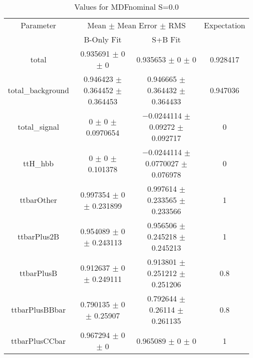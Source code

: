 \begin{table}
\centering
\caption{Values for MDFnominal S=0.0}
\begin{tabular}{cccc}
\toprule
Parameter & \multicolumn{2}{c}{Mean $\pm$ Mean Error $\pm$ RMS} & Expectation\\
 & B-Only Fit & S+B Fit & \\
\midrule
total & \num{0.935691} $\pm$ \num{0} $\pm$ \num{0} & \num{0.935653} $\pm$ \num{0} $\pm$ \num{0} & \num{0.928417}\\
total\_background & \num{0.946423} $\pm$ \num{0.364452} $\pm$ \num{0.364453} & \num{0.946665} $\pm$ \num{0.364432} $\pm$ \num{0.364433} & \num{0.947036}\\
total\_signal & \num{0} $\pm$ \num{0} $\pm$ \num{0.0970654} & \num{-0.0244114} $\pm$ \num{0.09272} $\pm$ \num{0.092717} & \num{0}\\
ttH\_hbb & \num{0} $\pm$ \num{0} $\pm$ \num{0.101378} & \num{-0.0244114} $\pm$ \num{0.0770027} $\pm$ \num{0.076978} & \num{0}\\
ttbarOther & \num{0.997354} $\pm$ \num{0} $\pm$ \num{0.231899} & \num{0.997614} $\pm$ \num{0.233565} $\pm$ \num{0.233566} & \num{1}\\
ttbarPlus2B & \num{0.954089} $\pm$ \num{0} $\pm$ \num{0.243113} & \num{0.956506} $\pm$ \num{0.245218} $\pm$ \num{0.245213} & \num{1}\\
ttbarPlusB & \num{0.912637} $\pm$ \num{0} $\pm$ \num{0.249111} & \num{0.913801} $\pm$ \num{0.251212} $\pm$ \num{0.251206} & \num{0.8}\\
ttbarPlusBBbar & \num{0.790135} $\pm$ \num{0} $\pm$ \num{0.25907} & \num{0.792644} $\pm$ \num{0.26114} $\pm$ \num{0.261135} & \num{0.8}\\
ttbarPlusCCbar & \num{0.967294} $\pm$ \num{0} $\pm$ \num{0} & \num{0.965089} $\pm$ \num{0} $\pm$ \num{0} & \num{1}\\
\bottomrule
\end{tabular}
\end{table}